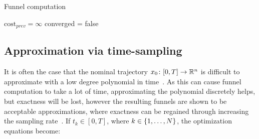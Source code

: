 \begin{algorithm}[p]
  \caption{Funnel computation}
  \label{alg:funnelalgorithm}
  \DontPrintSemicolon \SetAlgoNoLine

   

  \(\textrm{cost}_{\mathit{prev}} = \infty\)\; converged = false \;
  \;
\end{algorithm}

\subsection{Approximation via time-sampling}

It is often the case that the nominal trajectory \(x_{0} \colon [0,T]
\rightarrow \mathbb{R}^n\) is difficult to approximate with a low degree polynomial in
time~\cite{majumdarFunnelLibrariesRealtime2017}. As this can cause funnel
computation to take a lot of time, approximating the polynomial discretely
helps, but exactness will be lost, however the resulting funnels are shown to be
acceptable approximations, where exactness can be regained through increasing
the sampling rate~\cite{Tobenkin_2011}. If \(t_{k} \in [0,T]\), where \(k \in
\lbrace1,\ldots,N\rbrace\), the optimization equations become:

